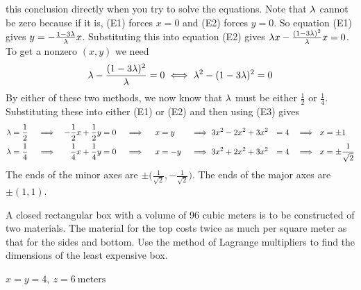 \begin{solution}
this conclusion directly when you try to solve the equations. Note that
$\lambda$ cannot be zero because if it is, (E1) forces $x=0$ and (E2) forces
$y=0$. So equation (E1) gives $y=-\frac{1-3\lambda}{\lambda}x$. Substituting this into
equation (E2) gives $\lambda x-\frac{(1-3\lambda)^2}{\lambda}x=0$. To get a nonzero
$(x,y)$ we need 
\begin{equation*}
\lambda -\frac{(1-3\lambda)^2}{\lambda}=0\iff \lambda^2-(1-3\lambda)^2=0
\end{equation*}
By either of these two methods, we now know that $\lambda$ must be either
$\frac{1}{2}$ or $\frac{1}{4}$. Substituting these into either (E1) or 
(E2) and then using (E3) gives
\begin{alignat*}{9}
\lambda&=\frac{1}{2}&&\implies& -\frac{1}{2} x+\frac{1}{2} y&=0 
                &&\implies\ & x&=y
                &&\implies 3x^2-2x^2+3x^2&=4
                &&\implies\ x&=\pm 1\\
\lambda&=\frac{1}{4}&&\implies& \frac{1}{4} x+\frac{1}{4} y&=0 
                &&\implies\ & x&=-y
                &&\implies 3x^2+2x^2+3x^2&=4
                &&\implies\ x&=\pm \frac{1}{\sqrt{2}}
\end{alignat*}
The ends of the minor axes are $\pm\big(\frac{1}{\sqrt{2}},-\frac{1}{\sqrt{2}}\big)$.
The ends of the major axes are $\pm(1,1)$.
\end{solution}

\begin{question}[M200 2003D] %
A closed rectangular box with a volume of 96 cubic meters
is to be constructed of two materials. The material for the top costs twice
as much per square meter as that for the sides and bottom. Use the method 
of Lagrange multipliers to find the dimensions of the least expensive box.
\end{question}

%

\begin{answer}
$x=y=4,\ z=6\ \text{meters}$
\end{answer}

